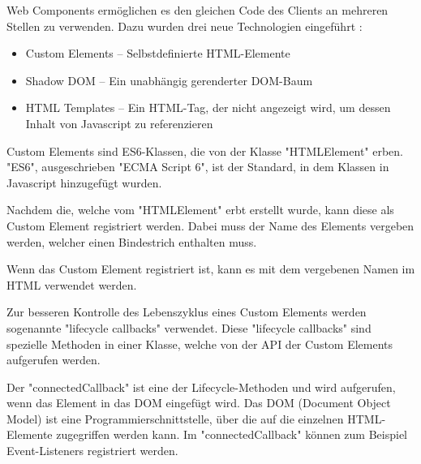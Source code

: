 
Web Components ermöglichen es den gleichen Code des Clients an mehreren Stellen zu verwenden. 
Dazu wurden drei neue Technologien eingeführt \cite{MDNWebComponents}:

\begin{itemize}
    \item Custom Elements -- Selbstdefinierte HTML-Elemente
    \item Shadow DOM -- Ein unabhängig gerenderter DOM-Baum
    \item HTML Templates -- Ein HTML-Tag, der nicht angezeigt wird, um dessen Inhalt von Javascript zu referenzieren
\end{itemize}



Custom Elements sind ES6-Klassen, die von der Klasse "{\ttfamily HTMLElement}" erben. 
"ES6", ausgeschrieben "ECMA Script 6", ist der Standard, in dem Klassen in Javascript hinzugefügt wurden. \cite{MDNes6Classes}


Nachdem die, welche vom "{\ttfamily HTMLElement}" erbt erstellt wurde, kann diese als Custom Element registriert werden. 
Dabei muss der Name des Elements vergeben werden, welcher einen Bindestrich enthalten muss.


Wenn das Custom Element registriert ist, kann es mit dem vergebenen Namen im HTML verwendet werden.


Zur besseren Kontrolle des Lebenszyklus eines Custom Elements werden sogenannte "lifecycle callbacks" verwendet.
Diese "lifecycle callbacks" sind spezielle Methoden in einer Klasse, welche von der API der Custom Elements aufgerufen werden. \cite{MDNWebCustomElements}


Der "{\ttfamily connectedCallback}" ist eine der Lifecycle-Methoden und wird aufgerufen, wenn das Element in das DOM eingefügt wird. 
Das DOM (Document Object Model) ist eine Programmierschnittstelle, über die auf die einzelnen HTML-Elemente zugegriffen werden kann. \cite{MDNDOM} Im "{\ttfamily connectedCallback}" können zum Beispiel Event-Listeners registriert werden. \cite{MDNWebCustomElements}

